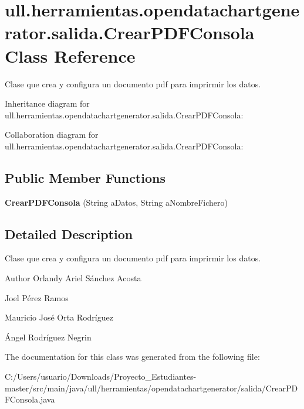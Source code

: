 \hypertarget{classull_1_1herramientas_1_1opendatachartgenerator_1_1salida_1_1_crear_p_d_f_consola}{}\section{ull.\+herramientas.\+opendatachartgenerator.\+salida.\+Crear\+P\+D\+F\+Consola Class Reference}
\label{classull_1_1herramientas_1_1opendatachartgenerator_1_1salida_1_1_crear_p_d_f_consola}


Clase que crea y configura un documento pdf para imprirmir los datos.  




Inheritance diagram for ull.\+herramientas.\+opendatachartgenerator.\+salida.\+Crear\+P\+D\+F\+Consola\+:


Collaboration diagram for ull.\+herramientas.\+opendatachartgenerator.\+salida.\+Crear\+P\+D\+F\+Consola\+:
\subsection*{Public Member Functions}
\begin{DoxyCompactItemize}
\item 
\mbox{\label{classull_1_1herramientas_1_1opendatachartgenerator_1_1salida_1_1_crear_p_d_f_consola_acd4d9bfbbf913202dd5252ad0e88933d}} 
{\bfseries Crear\+P\+D\+F\+Consola} (String a\+Datos, String a\+Nombre\+Fichero)
\end{DoxyCompactItemize}


\subsection{Detailed Description}
Clase que crea y configura un documento pdf para imprirmir los datos. 

\begin{DoxyAuthor}{Author}
Orlandy Ariel Sánchez Acosta 

Joel Pérez Ramos 

Mauricio José Orta Rodríguez 

Ángel Rodríguez Negrin 
\end{DoxyAuthor}


The documentation for this class was generated from the following file\+:\begin{DoxyCompactItemize}
\item 
C\+:/\+Users/usuario/\+Downloads/\+Proyecto\+\_\+\+Estudiantes-\/master/src/main/java/ull/herramientas/opendatachartgenerator/salida/Crear\+P\+D\+F\+Consola.\+java\end{DoxyCompactItemize}
